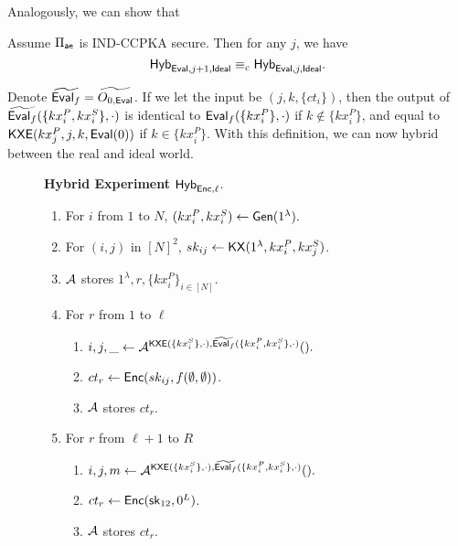 Analogously, we can show that
\begin{lemma}
     Assume $\Pi_{\mathsf{ae}}$ is IND-CCPKA secure. Then for any $j$, we have 
    $$\mathsf{Hyb}_{\mathsf{Eval}, j + 1, \mathsf{Ideal}} \equiv_c \mathsf{Hyb}_{\mathsf{Eval}, j, \mathsf{Ideal}}.$$
\end{lemma}
Denote $\widetilde{\mathsf{Eval}_f} = \widetilde{O_{0, \mathsf{Eval}}}$. If we let the input be $(j, k, \{ct_i\})$, then the output of $\widetilde{\mathsf{Eval}_f}(\{kx_i^P, kx_i^S\}, \cdot)$ is identical to $\mathsf{Eval}_f(\{kx_i^P\}, \cdot)$ if $k \notin \{kx_i^P\}$, and equal to $\mathsf{KXE}(kx_j^P, j, k, \mathsf{Eval}(0))$ if $k \in \{kx_i^P\}$. With this definition, we can now hybrid between the real and ideal world.

\begin{figure}[h!]
\begin{framed}
\textbf{Hybrid Experiment} $\mathsf{Hyb}_{\mathsf{Enc}, \ell}$.
\begin{enumerate}
    \item For $i$ from $1$ to $N$, $(kx_i^P, kx_i^S) \leftarrow \mathsf{Gen}(1^{\lambda}).$
    \item For $(i, j)$ in $[N]^2$, $sk_{ij} \leftarrow \mathsf{KX}(1^{\lambda}, kx_i^P, kx_j^S)$.
    \item $\mathcal{A}$ stores $1^{\lambda}, r, \{kx_i^P\}_{i \in [N]}$.
    \item For $r$ from $1$ to $\ell$
    \begin{enumerate}
        \item $i, j, \_ \leftarrow \mathcal{A}^{\mathsf{KXE}(\{kx_i^S\}, \cdot), \widetilde{\mathsf{Eval}_f}(\{kx_i^P, kx_i^S\}, \cdot)}().$
        \item $ct_r \leftarrow \mathsf{Enc}(sk_{ij}, f(\emptyset, \emptyset))$.
        \item $\mathcal{A}$ stores $ct_r$.
    \end{enumerate}
    \item For $r$ from $\ell + 1$ to $R$
    \begin{enumerate}
        \item $i, j, m \leftarrow \mathcal{A}^{\mathsf{KXE}(\{kx_i^S\}, \cdot), \widetilde{\mathsf{Eval}_f}(\{kx_i^P, kx_i^S\}, \cdot)}().$
        \item $ct_r \leftarrow \mathsf{Enc}({\mathsf{sk}}_{12}, 0^{L})$.
        \item $\mathcal{A}$ stores $ct_r$.
    \end{enumerate}
\end{enumerate}
\end{framed}
\end{figure}

